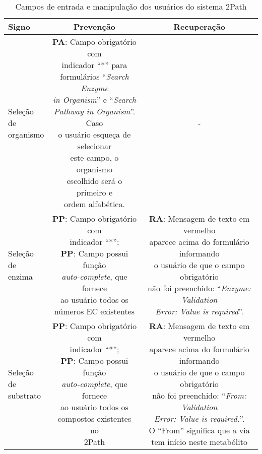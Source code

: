 \indent 
\begin{table}
\centering
\caption{Campos de entrada e manipulação dos usuários do sistema 2Path} \label{prevencaoRecuperacao:2Path}
\begin{tabular}{|l|c|c|}
\hline
{\cellcolor[HTML]{DFDFDF}\textbf{Signo}} &  {\cellcolor[HTML]{DFDFDF}\textbf{Prevenção}} &  {\cellcolor[HTML]{DFDFDF}\textbf{Recuperação}}\\ \hline
\specialcell{Seleção de\\organismo}  & \specialcell{\textbf{PA}: Campo obrigatório com\\indicador ``*'' para\\ formulários ``\textit{Search Enzyme}\\\textit{in Organism}'' e  ``\textit{Search}\\\textit{Pathway in Organism}''. Caso\\o usuário esqueça de selecionar\\este campo, o organismo\\escolhido será o primeiro e\\ordem alfabética.} & -  \\ \hline

\specialcell{Seleção de\\enzima} & \specialcell{\textbf{PP}: Campo obrigatório com\\indicador ``*'';\\\textbf{PP}: Campo possui função\\\textit{auto-complete}, que fornece\\ao usuário todos os\\números EC existentes} & \specialcell{\textbf{RA}: Mensagem de texto em vermelho \\aparece acima do formulário informando\\o usuário de que o campo obrigatório\\não foi preenchido: ``\textit{Enzyme: Validation}\\\textit{ Error: Value is required}''.} \\ \hline

\specialcell{Seleção de\\substrato} & \specialcell{\textbf{PP}: Campo obrigatório com\\indicador ``*'';\\\textbf{PP}: Campo possui função\\\textit{auto-complete}, que fornece\\ao usuário todos os\\compostos existentes no\\2Path} & \specialcell{\textbf{RA}: Mensagem de texto em vermelho \\aparece acima do formulário informando\\o usuário de que o campo obrigatório\\não foi preenchido: ``\textit{From: Validation}\\\textit{Error: Value is required.}''.\\O ``From'' significa que a via\\tem início neste metabólito} \\ \hline


\end{tabular}
\end{table}
